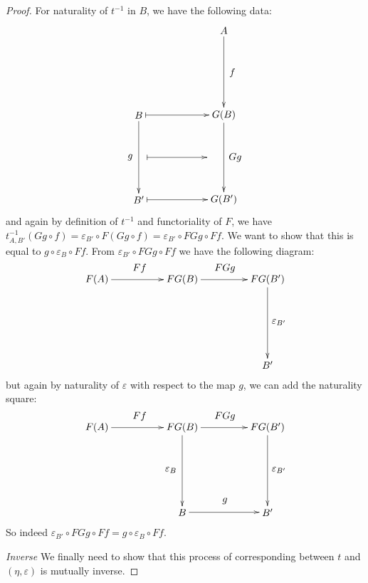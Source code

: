 \documentclass[11pt]{article}
\theoremstyle{definition}
\theoremstyle{definition}
\theoremstyle{plain}
\theoremstyle{plain}
\theoremstyle{plain}
\begin{document}
\begin{proof}
For naturality of $t^{-1}$ in $B$, we have the following data:
\begin{equation*}
\begin{xy}
(30, 0)*+{A}="a"; (0, -30)*+{B}="b"; (30, -30)*+{G(B)}="gb"; (0, -60)*+{B'}="bp"; (30, -60)*+{G(B')}="gbp";
{\ar "a";"gb"}?*!/_3mm/{f}; {\ar "gb";"gbp"}?*!/_4mm/{Gg}; {\ar "b";"bp"}?*!/^3mm/{g};
{\ar@{|->} "b";"gb"}; {\ar@{|->} "bp";"gbp"}; {\ar@{|->} (3, -45);(24, -45)};
\end{xy}
\end{equation*}
and again by definition of $t^{-1}$ and functoriality of $F$, we have $t^{-1}_{A,B'}(Gg \circ f) = \varepsilon_{B'} \circ F(Gg \circ f) = \varepsilon_{B'} \circ FGg \circ Ff$. We want to show that this is equal to $g \circ \varepsilon_{B} \circ Ff$. From $\varepsilon_{B'} \circ FGg \circ Ff$ we have the following diagram:
\begin{equation*}
\begin{xy}
(0,0)*+{F(A)}="1";(30,0)*+{FG(B)}="2";(60,0)*+{FG(B')}="3";(60,-30)*+{B'}="4";
{\ar "1";"2"}?*!/_4mm/{Ff};
{\ar "2";"3"}?*!/_4mm/{FGg};
{\ar "3";"4"}?*!/_4mm/{\varepsilon_{B'}};
\end{xy}
\end{equation*}
but again by naturality of $\varepsilon$ with respect to the map $g$, we can add the naturality square:
\begin{equation*}
\begin{xy}
(0,0)*+{F(A)}="1";(30,0)*+{FG(B)}="2";(60,0)*+{FG(B')}="3";(60,-30)*+{B'}="4";(30,-30)*+{B}="5";
{\ar "1";"2"}?*!/_4mm/{Ff};
{\ar "2";"3"}?*!/_4mm/{FGg};
{\ar "3";"4"}?*!/_4mm/{\varepsilon_{B'}};
{\ar "2";"5"}?*!/^4mm/{\varepsilon_{B}};
{\ar "5";"4"}?*!/_4mm/{g};
\end{xy}
\end{equation*}
So indeed $\varepsilon_{B'} \circ FGg \circ Ff = g \circ \varepsilon_{B} \circ Ff$.

\emph{Inverse}
We finally need to show that this process of corresponding between $t$ and $(\eta, \varepsilon)$ is mutually inverse. 


\end{proof}
\end{document}
